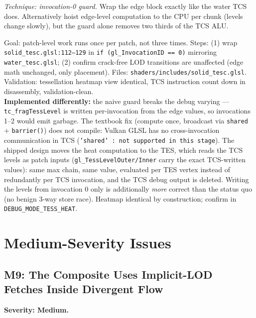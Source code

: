 \documentclass[11pt,a4paper]{article}
\begin{document}
\textit{Technique: invocation-0 guard.} Wrap the edge block exactly like the
water TCS does. Alternatively hoist edge-level computation to the CPU per
chunk (levels change slowly), but the guard alone removes two thirds of the
TCS ALU.

\begin{tcolorbox}[promptbox={Prompt --- H8: guard the solid TCS edge block}]
Goal: patch-level work runs once per patch, not three times. Steps:
(1) wrap \texttt{solid\_tesc.glsl:112--129} in
\texttt{if (gl\_InvocationID == 0)} mirroring \texttt{water\_tesc.glsl};
(2) confirm crack-free LOD transitions are unaffected (edge math unchanged,
only placement). Files: \texttt{shaders/includes/solid\_tesc.glsl}.
Validation: tessellation heatmap view identical, TCS instruction count down in
disassembly, validation-clean.
\\ \textbf{Implemented differently:} the naive guard breaks the debug
varying --- \texttt{tc\_fragTessLevel} is written per-invocation from the
edge values, so invocations 1--2 would emit garbage. The textbook fix
(compute once, broadcast via \texttt{shared} + \texttt{barrier()}) does not
compile: Vulkan GLSL has no cross-invocation communication in TCS
(\texttt{'shared' : not supported in this stage}). The shipped design moves
the heat computation to the TES, which reads the TCS levels as patch inputs
(\texttt{gl\_TessLevelOuter/Inner} carry the exact TCS-written values): same
max chain, same value, evaluated per TES vertex instead of redundantly per
TCS invocation, and the TCS debug output is deleted. Writing the levels from
invocation 0 only is additionally \emph{more} correct than the status quo
(no benign 3-way store race). Heatmap identical by construction; confirm in
\texttt{DEBUG\_MODE\_TESS\_HEAT}.
\end{tcolorbox}

\section{Medium-Severity Issues}

\subsection{M9: The Composite Uses Implicit-LOD Fetches Inside Divergent Flow}
\label{sec:m9}

\textbf{Severity: Medium.}
\end{document}
